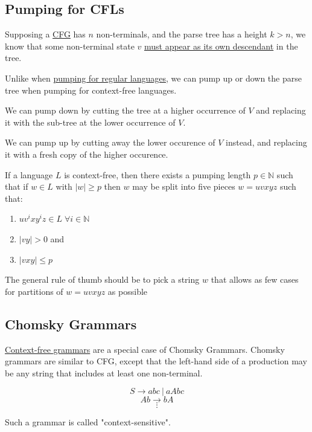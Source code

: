 \documentclass{article}
\begin{document}
\subsection{Pumping for CFLs}
Supposing a \hyperref[cfg]{CFG} has $n$ non-terminals, and the parse tree has a height $k > n$, we know that some non-terminal state $v$ \hyperref[pigeonhole-principle]{must appear as its own descendant} in the tree.

Unlike when \hyperref[pumping-lemma]{pumping for regular languages}, we can pump up or down the parse tree when pumping for context-free languages.

We can pump down by cutting the tree at a higher occurrence of $V$ and replacing it with the sub-tree at the lower occurrence of $V$.

We can pump up by cutting away the lower occurence of $V$ instead, and replacing it with a fresh copy of the higher occurence.

If a language $L$ is context-free, then there exists a pumping length $p \in \mathbb{N}$ such that if $w \in L$ with $|w| \geq p$ then $w$ may be split into five pieces $w = uvxyz$ such that:
\begin{enumerate}
    \item $uv^ixy^iz \in L \; \forall i \in \mathbb{N}$
    \item $|vy| > 0$ and
    \item $|vxy| \leq p$
\end{enumerate}

The general rule of thumb should be to pick a string $w$ that allows as few cases for partitions of $w = uvxyz$ as possible

\subsection{Chomsky Grammars}\label{context-sensitive}
\hyperref[cfg]{Context-free grammars} are a special case of Chomsky Grammars. Chomsky grammars are similar to CFG, except that the left-hand side of a production may be any string that includes at least one non-terminal.

\[S \to abc \:|\: aAbc\]
\[Ab \to bA\]
\[\vdots\]

Such a grammar is called "context-sensitive".
\end{document}
